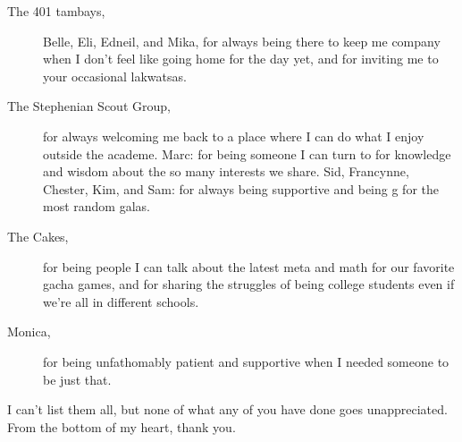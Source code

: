 \begin{description}
    \item[The 401 tambays,] Belle, Eli, Edneil, and Mika, for always being there to keep me company when I don't feel like going home for the day yet, and for inviting me to your occasional lakwatsas.
    \item[The Stephenian Scout Group,] for always welcoming me back to a place where I can do what I enjoy outside the academe. Marc: for being someone I can turn to for knowledge and wisdom about the so many interests we share. Sid, Francynne, Chester, Kim, and Sam: for always being supportive and being g for the most random galas.
    \item[The Cakes,] for being people I can talk about the latest meta and math for our favorite gacha games, and for sharing the struggles of being college students even if we're all in different schools.
    \item[Monica,] for being unfathomably patient and supportive when I needed someone to be just that.
\end{description}

I can't list them all, but none of what any of you have done goes unappreciated. From the bottom of my heart, thank you.
